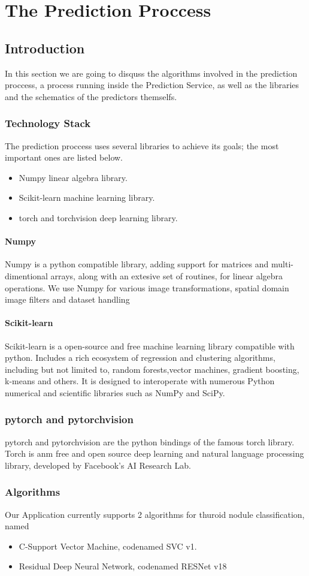 \chapter{The Prediction Proccess}
\label{prediction-process}
	\section{Introduction}
		In this section we are going to disquss the algorithms involved in the prediction proccess, a process running inside the Prediction
		Service, as well as the libraries and the schematics of the predictors themselfs.\par
		\subsection{Technology Stack}
			The prediction proccess uses several libraries to achieve its goals; the most important ones are listed below.
			\begin{itemize}
				\item Numpy linear algebra library.
				\item Scikit-learn machine learning library.
				\item torch and torchvision deep learning library.
			\end{itemize}
			\subsubsection{Numpy}
				Numpy is a python compatible library, adding support for matrices and multi-dimentional arrays, along with an 
				extesive set of routines, for linear algebra operations. We use Numpy for various image transformations, spatial domain
				image filters and dataset handling
				
			\subsubsection{Scikit-learn}
				Scikit-learn is a open-source and free machine learning library compatible with python. Includes a rich ecosystem of
				regression and clustering algorithms, including but not limited to, random forests,vector machines, gradient boosting, 
				k-means and others. It is designed to interoperate with numerous Python numerical and scientific libraries such as NumPy 
				and SciPy.
			\subsection{pytorch and pytorchvision}
				pytorch and pytorchvision are the python bindings of the famous torch library. Torch is anm free and open source deep 
				learning and natural language processing library, developed by Facebook's AI Research Lab.
		\subsection{Algorithms}
			
		
		
		
		Our Application currently supports 2 algorithms for thuroid nodule classification, named
		\begin{itemize}
			\item C-Support Vector Machine, codenamed SVC v1.
			\item Residual Deep Neural Network, codenamed RESNet v18
		\end{itemize}
	

